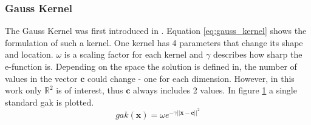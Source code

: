 \documentclass[./\jobname.tex]{subfiles}
\begin{document}
\subsubsection{Gauss Kernel}
\label{chap:gauss_kernel}
The Gauss Kernel was first introduced in \cite{broomhead_multivariable_1988}. Equation \eqref{eq:gauss_kernel} shows the formulation of such a kernel. One kernel has 4 parameters that change its shape and location. $\omega$ is a scaling factor for each kernel and $\gamma$ describes how sharp the e-function is. Depending on the space the solution is defined in, the number of values in the vector $\mathbf{c}$ could change - one for each dimension. However, in this work only $\mathbb{R}^2$ is of interest, thus $\mathbf{c}$ always includes 2 values. In figure \ref{fig:gauss_kernel_3d_plot} a single standard \gls{gak} is plotted. 
\begin{equation}
\label{eq:gauss_kernel}
gak(\mathbf{x}) = \omega e^{-\gamma ||\mathbf{x} - \mathbf{c}||^2}
\end{equation}
\newpage
\begin{figure}[H]
	\centering
	\noindent{}
	\label{fig:gauss_kernel_3d_plot}
\end{figure}
\end{document}
